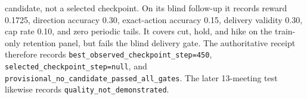 \begin{table}[htbp]
\begin{minipage}{0.97\textwidth}
        candidate, not a selected checkpoint. On its blind follow-up it records
        reward 0.1725, direction accuracy 0.30, exact-action accuracy 0.15,
        delivery validity 0.30, cap rate 0.10, and zero periodic tails. It covers
        cut, hold, and hike on the train-only retention panel, but fails the
        blind delivery gate. The authoritative receipt therefore records
        \texttt{best\_observed\_checkpoint\_step=450},
        \texttt{selected\_checkpoint\_step=null}, and
        \texttt{provisional\_no\_candidate\_passed\_all\_gates}. The later
        13-meeting test likewise records \texttt{quality\_not\_demonstrated}.
    \end{minipage}
    \caption{GRPO checkpoint-selection hard gates for \textit{Model chk-3}.
    No checkpoint satisfies the frozen eligibility rule; checkpoint 450 was
    evaluated only as the best-observed exploratory candidate through an
    explicit override.}
    \label{tab:app:chk3_grpo_selection_gates}
\end{table}
